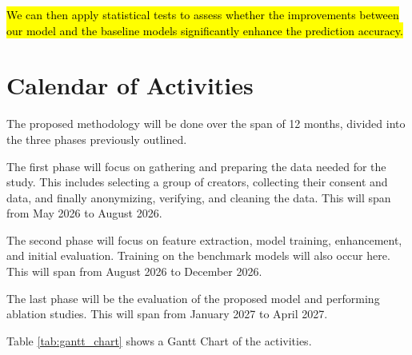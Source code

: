 \hl{We can then apply statistical tests to assess whether the improvements between our model and the baseline models significantly enhance the prediction accuracy.}

\section{Calendar of Activities}

The proposed methodology will be done over the span of 12 months, divided into the three phases previously outlined.

The first phase will focus on gathering and preparing the data needed for the study. This includes selecting a group of creators, collecting their consent and data, and finally anonymizing, verifying, and cleaning the data. This will span from May 2026 to August 2026. 

The second phase will focus on feature extraction, model training, enhancement, and initial evaluation. Training on the benchmark models will also occur here. This will span from August 2026 to December 2026.

The last phase will be the evaluation of the proposed model and performing ablation studies. This will span from January 2027 to April 2027.

Table \ref{tab:gantt_chart} shows a Gantt Chart of the activities.


\begin{table}[h]
    \centering
    \caption{Gantt Chart of Activities}
    \label{tab:gantt_chart}
\end{table}